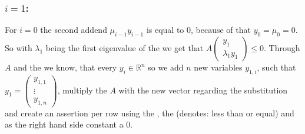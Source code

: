 \subsubsection{$i=1$:}
For $i=0$ the second addend $\mu_{i-1}y_{i-1}$ is equal to $0$, because of  that $y_0 = \mu_0 = 0$. So with $\lambda_1$ being the first eigenvalue of the \updatematrix we get that $A\begin{pmatrix} y_1 \\ \lambda_1 y_1 \end{pmatrix} \le 0$. \newline
Through $A$ and the \domc we know, that every $y_i\in \mathbb{R}^n$ so we add $n$ new variables $y_{1,i}$, such that $y_1 = \begin{pmatrix} y_{1,1} \\ \vdots \\ y_{1,n}\end{pmatrix}$, multiply the \updatematrix $A$ with the new vector regarding the substitution and create an assertion per row using the \smtfactory, the   (denotes: less than or equal) and as the right hand side constant a 0.

